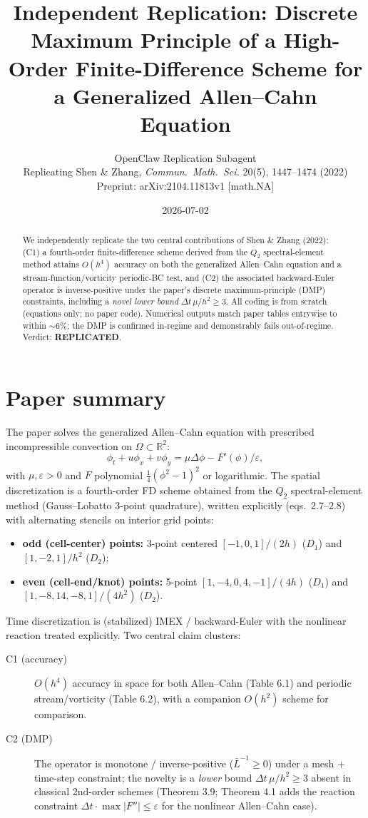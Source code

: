 \documentclass[11pt]{article}
\title{Independent Replication: Discrete Maximum Principle of a High-Order Finite-Difference Scheme for a Generalized Allen--Cahn Equation}
\author{OpenClaw Replication Subagent\\
        \small Replicating Shen \& Zhang, \emph{Commun.\ Math.\ Sci.} 20(5), 1447--1474 (2022)\\
        \small Preprint: arXiv:2104.11813v1 [math.NA]}
\date{2026-07-02}
\begin{document}
\maketitle

\begin{abstract}
We independently replicate the two central contributions of Shen \& Zhang (2022): (C1) a
fourth-order finite-difference scheme derived from the $Q_2$ spectral-element method attains
$O(h^4)$ accuracy on both the generalized Allen--Cahn equation and a stream-function/vorticity
periodic-BC test, and (C2) the associated backward-Euler operator is inverse-positive under the
paper's discrete maximum-principle (DMP) constraints, including a \emph{novel lower bound}
$\Delta t\,\mu/h^2 \geq 3$. All coding is from scratch (equations only; no paper code). Numerical
outputs match paper tables entrywise to within $\sim 6\%$; the DMP is confirmed in-regime and
demonstrably fails out-of-regime. Verdict: \textbf{REPLICATED}.
\end{abstract}

\section{Paper summary}
The paper solves the generalized Allen--Cahn equation with prescribed incompressible convection
on $\Omega\subset\mathbb{R}^2$:
\begin{equation}
\phi_t + u\phi_x + v\phi_y = \mu \Delta\phi - F'(\phi)/\varepsilon,
\label{eq:AC}
\end{equation}
with $\mu,\varepsilon>0$ and $F$ polynomial $\tfrac{1}{4}(\phi^2-1)^2$ or logarithmic. The
spatial discretization is a fourth-order FD scheme obtained from the $Q_2$ spectral-element
method (Gauss--Lobatto 3-point quadrature), written explicitly (eqs.~2.7--2.8) with alternating
stencils on interior grid points:
\begin{itemize}
  \item \textbf{odd (cell-center) points:} 3-point centered $[-1,0,1]/(2h)$ ($D_1$) and $[1,-2,1]/h^2$ ($D_2$);
  \item \textbf{even (cell-end/knot) points:} 5-point $[1,-4,0,4,-1]/(4h)$ ($D_1$) and $[1,-8,14,-8,1]/(4h^2)$ ($D_2$).
\end{itemize}
Time discretization is (stabilized) IMEX / backward-Euler with the nonlinear reaction treated
explicitly. Two central claim clusters:
\begin{description}
  \item[C1 (accuracy)] $O(h^4)$ accuracy in space for both Allen--Cahn (Table 6.1) and periodic
    stream/vorticity (Table 6.2), with a companion $O(h^2)$ scheme for comparison.
  \item[C2 (DMP)] The operator is monotone / inverse-positive ($\bar L^{-1}\ge 0$) under a mesh
    + time-step constraint; the novelty is a \emph{lower} bound $\Delta t\,\mu/h^2\ge 3$ absent
    in classical 2nd-order schemes (Theorem 3.9; Theorem 4.1 adds the reaction constraint
    $\Delta t\cdot \max|F''|\le\varepsilon$ for the nonlinear Allen--Cahn case).
\end{description}
\end{document}
